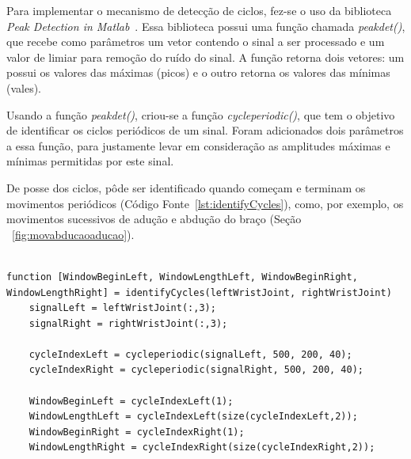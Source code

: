 Para implementar o mecanismo de detecção de ciclos, fez-se o uso da biblioteca \textit{Peak Detection in Matlab}~\cite{peakdetect}. Essa biblioteca possui uma função chamada \textit{peakdet()}, que recebe como parâmetros um vetor contendo o sinal a ser processado e um valor de limiar para remoção do ruído do sinal. A função retorna dois vetores: um possui os valores das máximas (picos) e o outro retorna os valores das mínimas (vales).

Usando a função \textit{peakdet()}, criou-se a função \textit{cycleperiodic()}, que tem o objetivo de identificar os ciclos periódicos de um sinal. Foram adicionados dois parâmetros a essa função, para justamente levar em consideração as amplitudes máximas e mínimas permitidas por este sinal.

%

De posse dos ciclos, pôde ser identificado quando começam e terminam os movimentos periódicos (Código Fonte~\ref{lst:identifyCycles}), como, por exemplo, os movimentos sucessivos de adução e abdução do braço (Seção ~\ref{fig:movabducaoaducao}). 

\begin{lstlisting}[frame=single, caption=Identificar início e término do movimento periódico, label=lst:identifyCycles]  % Start your code-block

function [WindowBeginLeft, WindowLengthLeft, WindowBeginRight, WindowLengthRight] = identifyCycles(leftWristJoint, rightWristJoint)
    signalLeft = leftWristJoint(:,3);
    signalRight = rightWristJoint(:,3);

    cycleIndexLeft = cycleperiodic(signalLeft, 500, 200, 40);
    cycleIndexRight = cycleperiodic(signalRight, 500, 200, 40);

    WindowBeginLeft = cycleIndexLeft(1);
    WindowLengthLeft = cycleIndexLeft(size(cycleIndexLeft,2));
    WindowBeginRight = cycleIndexRight(1);
    WindowLengthRight = cycleIndexRight(size(cycleIndexRight,2));
\end{lstlisting}

